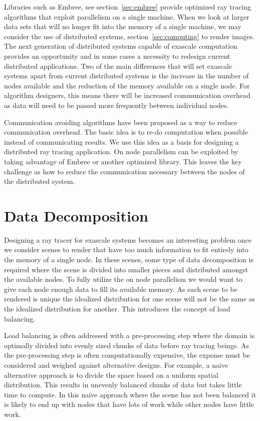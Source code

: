 \label{sec:design}

Libraries such as Embree, see section~\ref{sec:embree} provide optimized ray 
tracing algorithms that exploit parallelism on a single machine.  When we look
at larger data sets that will no longer fit into the memory of a single machine,
we may consider the use of distributed systems, section~\ref{sec:computing} to 
render images.  The next generation of distributed systems capable of exascale
computation provides an opportunity and in some cases a necessity to redesign 
current distributed applications.  Two of the main differences that will set
exascale systems apart from current distributed systems is the increase in the
number of nodes available and the reduction of the memory available on a single
node.  For algorithm designers, this means there will be increased communication 
overhead as data will need to be passed more frequently between individual nodes.

Communication avoiding algorithms have been proposed as a way to reduce 
communication overhead.  The basic idea is to re-do computation when possible
instead of communicating results.  We use this idea as a basis for designing a 
distributed ray tracing application.  On node parallelism can be exploited by
taking advantage of Embree or another optimized library.  This leaves the key 
challenge as how to reduce the communication necessary between the nodes of the 
distributed system.

\section{Data Decomposition}
\label{sec:data_decomposition}
Designing a ray tracer for exascale systems becomes an interesting problem once
we consider scenes to render that have too much information to fit entirely into
the memory of a single node.  In these scenes, some type of data decomposition 
is required where the scene is divided into smaller pieces and distributed 
amongst the available nodes. To fully utilize the on node parallelism we would 
want to give each node enough data to fill its available memory. As each scene 
to be rendered is unique the idealized distribution for one scene will not be 
the same as the idealized distribution for another.  This introduces the concept 
of load balancing.

Load balancing is often addressed with a pre-processing step where the domain is 
optimally divided into evenly sized chunks of data before ray tracing beings. 
As the pre-processing step is often computationally expensive, the expense must 
be considered and weighed against alternative designs. For example, a naive 
alternative approach is to divide the space based on a uniform spatial 
distribution.  This results in unevenly balanced chunks of data but takes little
time to compute.  In this naive approach where the scene has not been balanced 
it is likely to end up with nodes that have lots of work while other nodes have 
little work.

